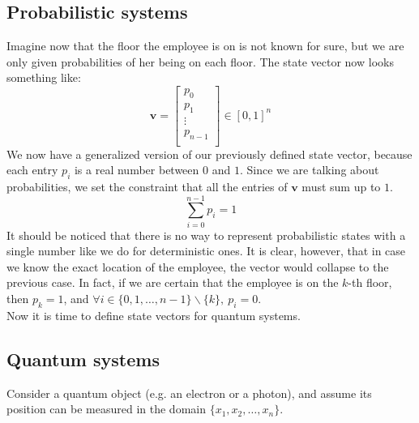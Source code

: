 \documentclass[12pt,a4paper]{report}
\theoremstyle{definition}
\theoremstyle{definition}
\theoremstyle{definition}
\begin{document}
\subsection{Probabilistic systems}
Imagine now that the floor the employee is on is not known for sure, but we are only given probabilities of her being on each floor. The state vector now looks something like:
\begin{equation*}
    \mathbf{v}=\begin{bmatrix}
        p_0\\
        p_1\\
        \vdots\\
        p_{n-1}\\
    \end{bmatrix}\in [0,1]^n
\end{equation*}
We now have a generalized version of our previously defined state vector, because each entry $p_i$ is a real number between $0$ and $1$. Since we are talking about probabilities, we set the constraint that all the entries of $\mathbf{v}$ must sum up to $1$.
\begin{equation*}
    \sum_{i=0}^{n-1} p_i = 1
\end{equation*}
It should be noticed that there is no way to represent probabilistic states with a single number like we do for deterministic ones. It is clear, however, that in case we know the exact location of the employee, the vector would collapse to the previous case. In fact, if we are certain that the employee is on the $k$-th floor, then $p_k=1$, and $\forall i \in \{0,1,\ldots,n-1\} \smallsetminus \{k\},\ p_i=0$.\\
Now it is time to define state vectors for quantum systems.\\




\subsection{Quantum systems}
Consider a quantum object (e.g. an electron or a photon), and assume its position can be measured in the domain $\{x_1, x_2, \ldots, x_n\}$.\\
\begin{center}
\end{center}
\end{document}
